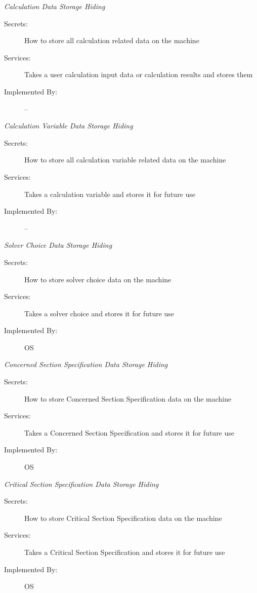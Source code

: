 \documentclass[12pt, titlepage]{article}
\begin{document}
      \hypertarget{CDSH}{\emph{{\large Calculation Data Storage Hiding}}}
    \begin{description}
        \item[Secrets:] How to store all calculation related data on the machine
        \item[Services:]Takes a user calculation input data or calculation results and stores them 
        \item[Implemented By:] --\\
    \end{description}
      \hypertarget{CVDSH}{\emph{{\large Calculation Variable Data Storage Hiding}}}
    \begin{description}
        \item[Secrets:] How to store all calculation variable related data on the machine
        \item[Services:]Takes a calculation variable and stores it for future use
        \item[Implemented By:] --\\
    \end{description}
      \hypertarget{SCDSH}{\emph{{\large Solver Choice Data Storage Hiding}}}
    \begin{description}
        \item[Secrets:] How to store solver choice data on the machine
        \item[Services:]Takes a solver choice and stores it for future use
        \item[Implemented By:] OS\\
    \end{description}
      \hypertarget{CSSDSH}{\emph{{\large Concerned Section Specification Data Storage Hiding}}}
    \begin{description}
        \item[Secrets:] How to store Concerned Section Specification data on the machine
        \item[Services:]Takes a Concerned Section Specification and stores it for future use
        \item[Implemented By:] OS\\
    \end{description}
      \hypertarget{CSSDSH}{\emph{{\large Critical Section Specification Data Storage Hiding}}}
    \begin{description}
        \item[Secrets:] How to store Critical Section Specification data on the machine
        \item[Services:]Takes a Critical Section Specification and stores it for future use
        \item[Implemented By:] OS\\
    \end{description}
\end{document}
